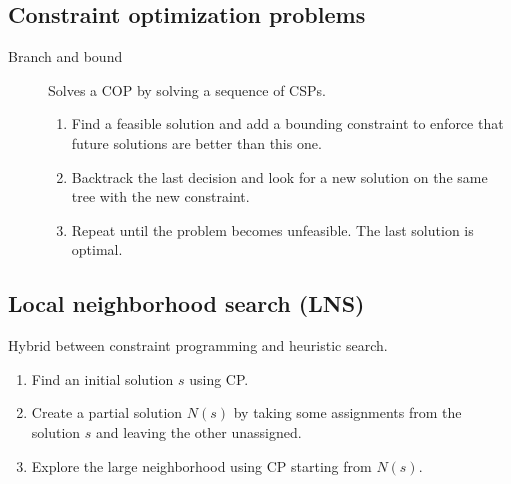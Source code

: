 \subsection{Constraint optimization problems}

\begin{description}
    \item[Branch and bound]
        Solves a COP by solving a sequence of CSPs.
        \begin{enumerate}
            \item Find a feasible solution and add a bounding constraint 
                to enforce that future solutions are better than this one.
            \item Backtrack the last decision and look for a new solution on the same tree with the new constraint.
            \item Repeat until the problem becomes unfeasible. The last solution is optimal.
        \end{enumerate}
\end{description}


\subsection{Local neighborhood search (LNS)}

Hybrid between constraint programming and heuristic search.
\begin{enumerate}
    \item Find an initial solution $s$ using CP.
    \item Create a partial solution $N(s)$ by taking some assignments from the solution $s$ and leaving the other unassigned.
    \item Explore the large neighborhood using CP starting from $N(s)$.
\end{enumerate}